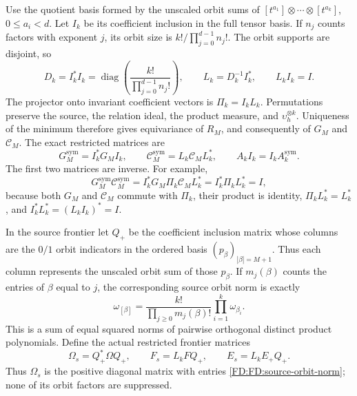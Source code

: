 Use the quotient basis formed by the unscaled orbit sums of
\([t^{a_1}]\otimes\cdots\otimes[t^{a_k}]\), \(0\le a_i<d\).
Let \(I_k\) be its coefficient inclusion in the full tensor basis.
If \(n_j\) counts factors with exponent \(j\), its orbit size is
\(k!/\prod_{j=0}^{d-1}n_j!\).  The orbit supports are disjoint, so
\begin{equation}
D_k=I_k^*I_k
=\operatorname{diag}\left(\frac{k!}{\prod_{j=0}^{d-1}n_j!}\right),
\qquad L_k=D_k^{-1}I_k^*,\qquad L_kI_k=I.
\tag{FD.22}\label{FD:FD:orbit-coordinates}
\end{equation}
The projector onto invariant coefficient vectors is \(\Pi_k=I_kL_k\).
Permutations preserve the source, the relation ideal, the product
measure, and \(\upsilon_h^{\otimes k}\).  Uniqueness of the minimum
therefore gives equivariance of \(R_M\), and consequently of \(G_M\)
and \(\mathcal C_M\).  The exact restricted matrices are
\begin{equation}
G_M^{\mathrm{sym}}=I_k^*G_MI_k,\qquad
\mathcal C_M^{\mathrm{sym}}=L_k\mathcal C_ML_k^*,\qquad
A_kI_k=I_kA_k^{\mathrm{sym}}.
\tag{FD.23}\label{FD:FD:symmetric-matrices}
\end{equation}
The first two matrices are inverse.  For example,
\[
G_M^{\mathrm{sym}}\mathcal C_M^{\mathrm{sym}}
=I_k^*G_M\Pi_k\mathcal C_ML_k^*
=I_k^*\Pi_kL_k^*=I,
\]
because both \(G_M\) and \(\mathcal C_M\) commute with \(\Pi_k\),
their product is identity, \(\Pi_kL_k^*=L_k^*\), and
\(I_k^*L_k^*=(L_kI_k)^*=I\).

In the source frontier let \(Q_+\) be the coefficient inclusion matrix
whose columns are the \(0/1\) orbit indicators in the ordered basis
\((p_\beta)_{|\beta|=M+1}\).  Thus each column represents the
unscaled orbit sum of those \(p_\beta\).  If \(m_j(\beta)\)
counts the entries of \(\beta\) equal to \(j\), the corresponding
source orbit norm is exactly
\begin{equation}
\omega_{[\beta]}=
\frac{k!}{\prod_{j\ge0}m_j(\beta)!}\prod_{i=1}^k\omega_{\beta_i}.
\tag{FD.24}\label{FD:FD:source-orbit-norm}
\end{equation}
This is a sum of equal squared norms of pairwise orthogonal distinct
product polynomials.  Define the actual restricted frontier matrices
\begin{equation}
\Omega_s=Q_+^*\Omega Q_+,\qquad
F_s=L_kFQ_+,\qquad E_s=L_kE_+Q_+.
\tag{FD.25}\label{FD:FD:symmetric-frontier}
\end{equation}
Thus \(\Omega_s\) is the positive diagonal matrix with entries
\eqref{FD:FD:source-orbit-norm}; none of its orbit factors are suppressed.

